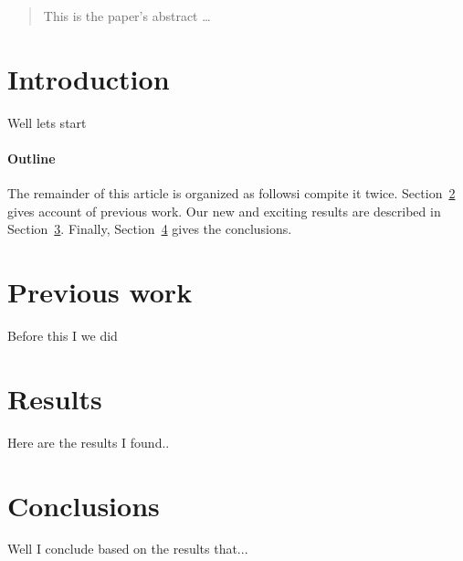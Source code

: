 \documentclass[12pt]{article}
\begin{document}
\maketitle

\begin{abstract}
This is the paper's abstract \ldots
\end{abstract}

\section{Introduction}
Well lets start 

\paragraph{Outline}
The remainder of this article is organized as followsi compite it twice.
Section~\ref{previous work} gives account of previous work.
Our new and exciting results are described in Section~\ref{results}.
Finally, Section~\ref{conclusions} gives the conclusions.

\section{Previous work}\label{previous work}
Before this I we did

\section{Results}\label{results}
Here are the results I found..

\section{Conclusions}\label{conclusions}
Well I conclude based on the results that...




\end{document}
